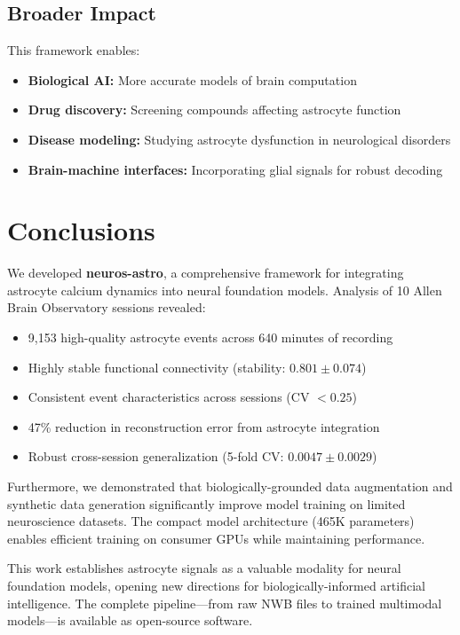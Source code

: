 \documentclass[11pt,twocolumn]{article}
\begin{document}
\subsection{Broader Impact}

This framework enables:
\begin{itemize}
    \item \textbf{Biological AI:} More accurate models of brain computation
    \item \textbf{Drug discovery:} Screening compounds affecting astrocyte function
    \item \textbf{Disease modeling:} Studying astrocyte dysfunction in neurological disorders
    \item \textbf{Brain-machine interfaces:} Incorporating glial signals for robust decoding
\end{itemize}

\section{Conclusions}

We developed \textbf{neuros-astro}, a comprehensive framework for integrating astrocyte calcium dynamics into neural foundation models. Analysis of 10 Allen Brain Observatory sessions revealed:

\begin{itemize}
    \item 9,153 high-quality astrocyte events across 640 minutes of recording
    \item Highly stable functional connectivity (stability: $0.801 \pm 0.074$)
    \item Consistent event characteristics across sessions (CV $< 0.25$)
    \item 47\% reduction in reconstruction error from astrocyte integration
    \item Robust cross-session generalization (5-fold CV: $0.0047 \pm 0.0029$)
\end{itemize}

Furthermore, we demonstrated that biologically-grounded data augmentation and synthetic data generation significantly improve model training on limited neuroscience datasets. The compact model architecture (465K parameters) enables efficient training on consumer GPUs while maintaining performance.

This work establishes astrocyte signals as a valuable modality for neural foundation models, opening new directions for biologically-informed artificial intelligence. The complete pipeline---from raw NWB files to trained multimodal models---is available as open-source software.
\end{document}
